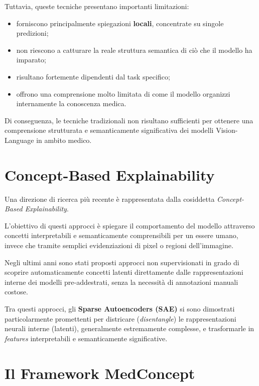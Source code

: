 Tuttavia, queste tecniche presentano importanti limitazioni:

\begin{itemize}
    \item forniscono principalmente spiegazioni \textbf{locali}, concentrate su singole predizioni;
    
    \item non riescono a catturare la reale struttura semantica di ciò che il modello ha imparato;
    
    \item risultano fortemente dipendenti dal task specifico;
    
    \item offrono una comprensione molto limitata di come il modello organizzi internamente la conoscenza medica.
\end{itemize}

Di conseguenza, le tecniche tradizionali non risultano sufficienti per ottenere una comprensione strutturata e semanticamente significativa dei modelli Vision-Language in ambito medico.

\section{Concept-Based Explainability}

Una direzione di ricerca più recente è rappresentata dalla cosiddetta \textit{Concept-Based Explainability}.

L'obiettivo di questi approcci è spiegare il comportamento del modello attraverso concetti interpretabili e semanticamente comprensibili per un essere umano, invece che tramite semplici evidenziazioni di pixel o regioni dell'immagine.

Negli ultimi anni sono stati proposti approcci non supervisionati in grado di scoprire automaticamente concetti latenti direttamente dalle rappresentazioni interne dei modelli pre-addestrati, senza la necessità di annotazioni manuali costose.

Tra questi approcci, gli \textbf{Sparse Autoencoders (SAE)} si sono dimostrati particolarmente promettenti per districare (\textit{disentangle}) le rappresentazioni neurali interne (latenti), generalmente estremamente complesse, e trasformarle in \textit{features} interpretabili e semanticamente significative.

\section{Il Framework MedConcept}


